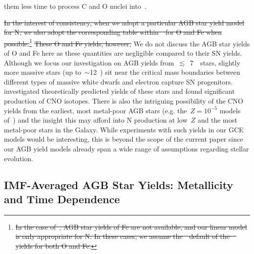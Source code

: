 \documentclass[ms.tex]{subfiles}
\begin{document}
them less time to process C and O nuclei into~\Nfourteen.
\par
{\color{red}
\sout{
In the interest of consistency, when we adopt a particular AGB star yield model
for N, we also adopt the corresponding table within~\vice~for O and Fe when
possible.}\footnote{
	\color{red}
	\sout{In the case of~\mbox{\citet{Ventura2013, Ventura2014, Ventura2018,
	Ventura2020}},
	AGB star yields of Fe are not available, and our linear model is only
	appropriate for N.
	In these cases, we assume the~\vice~default of the~\mbox{
	\citet{Cristallo2011, Cristallo2015}} yields for both O and Fe.}
}
\sout{These O and Fe yields, however,} We do not discuss the AGB star yields of
O and Fe here as these quantities are negligible compared to their SN yields.
}
Although we focus our investigation on AGB yields from~$\lesssim$~7~\msun~stars,
slightly more massive stars (up to~$\sim$12~\msun) sit near the critical mass
boundaries between different types of massive white dwarfs and electron capture
SN progenitors.
\citet{Doherty2017} investigated theoretically predicted yields of these stars
and found significant production of CNO isotopes.
There is also the intriguing possibility of the CNO yields from the earliest,
most metal-poor AGB stars (e.g. the~$Z = 10^{-5}$ models
of~\citealp{Gil-Pons2013, Gil-Pons2021}) and the insight this may afford into
N production at low~$Z$ and the most metal-poor stars in the Galaxy.
While experiments with such yields in our GCE models would be interesting, this
is beyond the scope of the current paper since our AGB yield models already
span a wide range of assumptions regarding stellar evolution.



\subsection{IMF-Averaged AGB Star Yields: Metallicity and Time Dependence}
\label{sec:yields:imf_agb}
\end{document}
